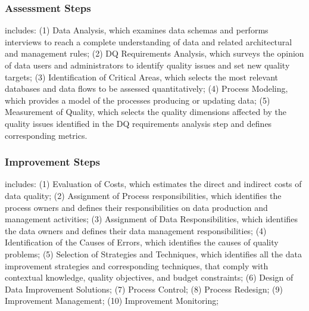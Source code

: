 \documentclass[pdftex,english,oribibl]{llncs}
\begin{document}
\begin{comment}
The term assessment is used when such measurements are compared to reference values, in order to enable a diagnosis of quality. The term assessment is adopted in this article, consistent with the majority of methodologies, which stress the importance of the causes of poor data quality.
\end{comment}

\subsubsection{Assessment Steps}
includes:
(1) Data Analysis, which examines data schemas and performs interviews to reach a complete understanding of data and related architectural and management rules;
(2) DQ Requirements Analysis, which surveys the opinion of data users and administrators to identify quality issues and set new quality targets;
(3) Identification of Critical Areas, which selects the most relevant databases and data flows to be assessed quantitatively;
(4) Process Modeling, which provides a model of the processes producing or updating data;
(5) Measurement of Quality, which selects the quality dimensions affected by the quality issues identified in the DQ requirements analysis step and defines corresponding metrics.
\begin{comment}
measurement can be objective when it is based on quantitative metrics, or subjective, when it is based on qualitative evaluations by data administrators and users.
\end{comment}

\subsubsection{Improvement Steps}
includes:
(1) Evaluation of Costs, which estimates the direct and indirect costs of data quality;
(2) Assignment of Process responsibilities, which identifies the process owners and defines their responsibilities on data production and management activities;
(3) Assignment of Data Responsibilities, which identifies the data owners and defines their data management responsibilities;
(4) Identification of the Causes of Errors, which identifies the causes of quality problems;
(5) Selection of Strategies and Techniques, which identifies all the data improvement strategies and corresponding techniques, that comply with contextual knowledge, quality objectives, and budget constraints;
(6) Design of Data Improvement Solutions;
(7) Process Control;
(8) Process Redesign;
(9) Improvement Management;
(10) Improvement Monitoring;
\end{document}
